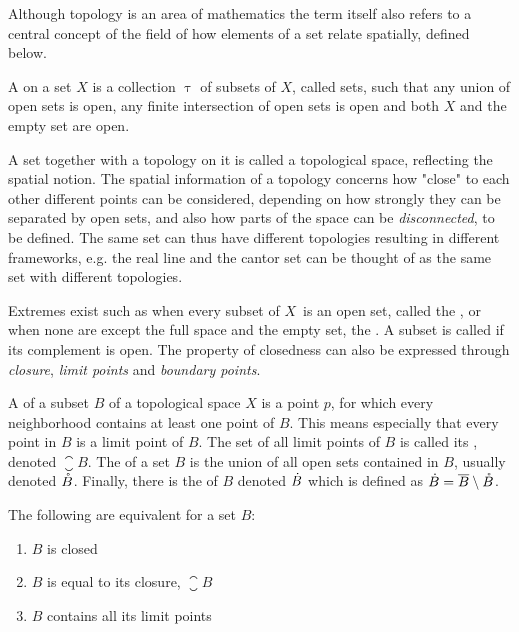 \documentclass[../../main.tex]{subfiles}
\begin{document}
    Although topology is an area of mathematics the term itself also refers to a central concept of the field of how elements of a set relate spatially, defined below. 

    \begin{definition}
        A  on a set $X$ is a collection $\uptau$ of subsets of $X$, called  sets, such that any union of open sets is open, any finite intersection of open sets is open and both $X$ and the empty set are open. 
    \end{definition}

    A set together with a topology on it is called a topological space, reflecting the spatial notion. The spatial information of a topology concerns how "close" to each other different points can be considered, depending on how strongly they can be separated by open sets, and also how parts of the space can be \textit{disconnected}, to be defined. The same set can thus have different topologies resulting in different frameworks, e.g. the real line and the cantor set can be thought of as the same set with different topologies. 

    Extremes exist such as when every subset of $X$ is an open set, called the , or when none are except the full space and the empty set, the . A subset is called  if its complement is open. The property of closedness can also be expressed through \emph{closure}, \emph{limit points} and \emph{boundary points}. 
    
    A  of a subset $B$ of a topological space $X$ is a point $p$, for which every neighborhood contains at least one point of $B$. This means especially that every point in $B$ is a limit point of $B$. The set of all limit points of $B$ is called its , denoted $\closure{B}$. The  of a set $B$ is the union of all open sets contained in $B$, usually denoted $\mathring{B}$. Finally, there is the  of $B$ denoted $\dot{B}$ which is defined as $\dot{B} = \overline{B} \setminus \mathring{B}$.

    \begin{proposition}
        The following are equivalent for a set $B$:
        \begin{enumerate}
            \item $B$ is closed
            \item $B$ is equal to its closure, $\closure{B}$
            \item $B$ contains all its limit points
        \end{enumerate}
    \end{proposition}
\end{document}
